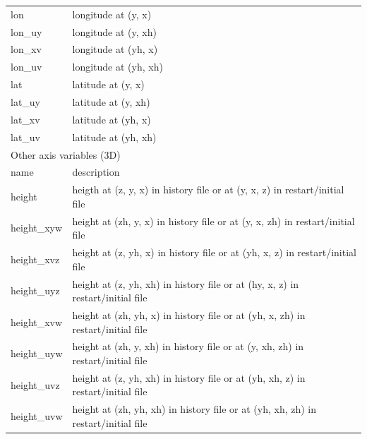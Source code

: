 \begin{longtable}{l|l}
lon     & longitude at (y, x) \\
lon\_uy & longitude at (y, xh) \\
lon\_xv & longitude at (yh, x) \\
lon\_uv & longitude at (yh, xh) \\
lat     & latitude  at (y, x) \\
lat\_uy & latitude  at (y, xh) \\
lat\_xv & latitude  at (yh, x) \\
lat\_uv & latitude  at (yh, xh) \\
\hline
\multicolumn{2}{l}{Other axis variables (3D)}\\ \hline
name & description \\ \hline \hline
height      & heigth at (z, y, x)    in history file or at (y, x, z)    in restart/initial file\\
height\_xyw & height at (zh, y, x)   in history file or at (y, x, zh)   in restart/initial file\\
height\_xvz & height at (z, yh, x)   in history file or at (yh, x, z)   in restart/initial file\\
height\_uyz & height at (z, yh, xh)  in history file or at (hy, x, z)   in restart/initial file\\
height\_xvw & height at (zh, yh, x)  in history file or at (yh, x, zh)  in restart/initial file\\
height\_uyw & height at (zh, y, xh)  in history file or at (y, xh, zh)  in restart/initial file\\
height\_uvz & height at (z, yh, xh)  in history file or at (yh, xh, z)  in restart/initial file\\
height\_uvw & height at (zh, yh, xh) in history file or at (yh, xh, zh) in restart/initial file\\
\end{longtable}



